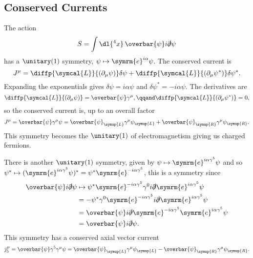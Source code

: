 \documentclass[fleqn]{NotesClass}
\newcommand{\e}{\symrm{e}}
\newcommand{\Left}{\symup{L}}
\newcommand{\Right}{\symup{R}}
\newcommand{\diracadjoint}[1]{\overbar{#1}}
\newcommand{\lagrangianDensity}{\symcal{L}}
\begin{document}
    \subsection{Conserved Currents}
    The action
    \begin{equation}
        S = \int \dl{^4x} \, \diracadjoint{\psi} i\slashed{\partial}\psi
    \end{equation}
    has a \(\unitary(1)\) symmetry, \(\psi \mapsto \e^{i\alpha}\psi\).
    The conserved current is
    \begin{equation}
        J^\mu = \diffp{\lagrangianDensity}{(\partial_\mu \psi)}\delta\psi + \diffp{\lagrangianDensity}{(\partial_\mu \psi^*)}\delta\psi^*.
    \end{equation}
    Expanding the exponentials gives \(\delta\psi = i\alpha\psi\) and \(\delta\psi^* = -i\alpha\psi\).
    The derivatives are
    \begin{equation}
        \diffp{\lagrangianDensity}{(\partial_\mu \psi)} = \diracadjoint{\psi}\gamma^\mu, \qqand \diffp{\lagrangianDensity}{(\partial_\mu \psi^*)} = 0,
    \end{equation}
    so the conserved current is, up to an overall factor
    \begin{equation}
        J^\mu = \diracadjoint{\psi} \gamma^\mu \psi = \diracadjoint{\psi}_{\Left} \gamma^\mu \psi_{\Left} + \diracadjoint{\psi}_{\Right}\gamma^\mu \psi_{\Right}.
    \end{equation}
    This symmetry becomes the \(\unitary(1)\) of electromagnetism giving us charged fermions.
    
    There is another \(\unitary(1)\) symmetry, given by \(\psi \mapsto \e^{i\alpha \gamma^5}\psi\) and so \(\psi^* \mapsto (\e^{i\alpha \gamma^5}\psi)^* = \psi^* \e^{-i\alpha\gamma^5}\), this is a symmetry since
    \begin{align}
        \diracadjoint{\psi} i \slashed{\partial} \psi &\mapsto \psi^* \e^{-i\alpha \gamma^5} \gamma^0 i\slashed{\partial} \e^{i\alpha\gamma^5} \psi\\
        &= -\psi^* \gamma^0 \e^{-i\alpha \gamma^5} i\slashed{\partial} \e^{i\alpha\gamma^5} \psi\\
        &= \diracadjoint{\psi} i\slashed{\partial} \e^{-i\alpha\gamma^5} \e^{i\alpha\gamma^5}\psi\\
        &= \diracadjoint{\psi} i\slashed{\partial} \psi.
    \end{align}
    This symmetry has a conserved axial vector current
    \begin{equation}
        j_5^\mu = \diracadjoint{\psi} \gamma^5 \gamma^\mu \psi = \diracadjoint{\psi}_{\Left}\gamma^\mu \psi_{\Left} - \diracadjoint{\psi}_{\Right} \gamma^\mu \psi_{\Right}.
    \end{equation}
    
\end{document}
